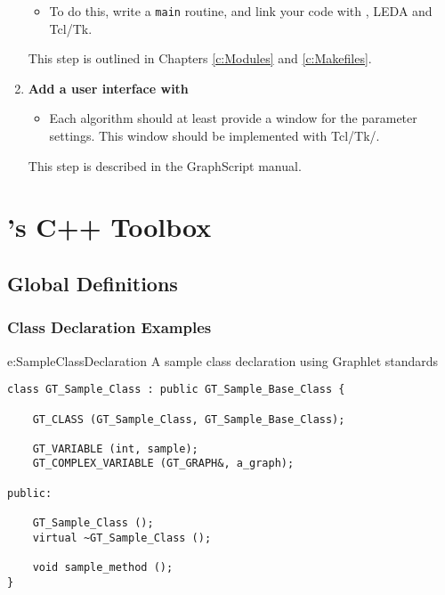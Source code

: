 \documentclass[twoside,fleqn]{report}
\begin{document}
\begin{enumerate}
  \begin{itemize}
    \item To do this, write a \texttt{main} routine, and link
    your code with \Graphlet{}, LEDA and Tcl/Tk.
  \end{itemize}
  
  This step is outlined in Chapters \ref{c:Modules} and
  \ref{c:Makefiles}.
  
  \item \textbf{Add a user interface with \GraphScript{}}

  \begin{itemize}
  
    \item Each algorithm should at least provide a window for the
    parameter settings. This window should be implemented with
    Tcl/Tk/\GraphScript{}.

  \end{itemize}

  This step is described in the GraphScript manual.
  
\end{enumerate}


%
%

\chapter{\Graphlet{}'s C++ Toolbox}
\label{c:Toolbox}



%
%

\section{Global Definitions}
\label{s:GlobalDefinitions}



%
%
%

\subsection{Class Declaration Examples}

\begin{example}{e:SampleClassDeclaration}%
{A sample class declaration using Graphlet standards}
\begin{verbatim}
class GT_Sample_Class : public GT_Sample_Base_Class {

    GT_CLASS (GT_Sample_Class, GT_Sample_Base_Class);

    GT_VARIABLE (int, sample);
    GT_COMPLEX_VARIABLE (GT_GRAPH&, a_graph);

public:

    GT_Sample_Class ();
    virtual ~GT_Sample_Class ();

    void sample_method ();
}

\end{verbatim}
\end{example}
\end{document}
